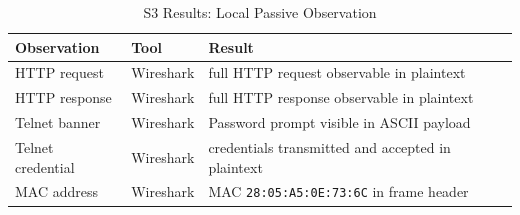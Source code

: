 \begin{table}[H]
    \centering
    \caption{S3 Results: Local Passive Observation}
    \label{tab:s3-local-passive-observation-results}
    \begin{tabularx}{\textwidth}{p{} p{} L}
        \toprule
        \textbf{\color{white}Observation} & \textbf{\color{white}Tool} & \textbf{\color{white}Result} \\
        \midrule
        HTTP request & Wireshark & full HTTP request observable in plaintext \\
        HTTP response & Wireshark & full HTTP response observable in plaintext \\
        Telnet banner & Wireshark & Password prompt visible in ASCII payload \\
        Telnet credential & Wireshark & credentials transmitted and accepted in plaintext \\
        MAC address & Wireshark & MAC \texttt{28:05:A5:0E:73:6C} in frame header \\
        \bottomrule
    \end{tabularx}
\end{table}
